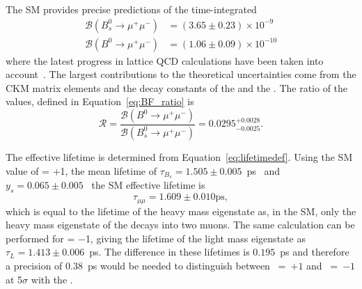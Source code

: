 The SM provides precise predictions of the time-integrated \bmumu \BFs~\cite{Bobeth:2013uxa} %
\begin{align}
\mathcal{B}(B^0_{s} \to \mu^+ \mu^-)& = (3.65 \pm 0.23) \times 10^{-9}\\
\mathcal{B}(B^0 \to\mu^+ \mu^-)& = (1.06 \pm 0.09) \times 10^{-10}
\end{align}
where the latest progress in lattice QCD calculations have been taken into account~\cite{Bazavov:2011aa, Na:2012kp,Witzel:2013sla}. %
The largest contributions to the theoretical uncertainties come from the CKM matrix elements and the decay constants of the \bs and the \bd.
The ratio of the \BF values, defined in Equation~\ref{eq:BF_ratio} is~\cite{CMS:2014xfa} 
\begin{equation}
\mathcal{R} = \frac{\mathcal{B}(B^0 \to\mu^+ \mu^-)}{\mathcal{B}(B^0_{s} \to \mu^+ \mu^-)} = 0.0295^{+0.0028}_{-0.0025}.
\end{equation}


The \bsmumu effective lifetime is determined from Equation~\ref{eq:lifetimedef}. Using the SM value of \ADG = +1, the \bs mean lifetime of $\tau_{B_{s}} = 1.505 \pm 0.005$~ps~\cite{Amhis:2016xyh} and $y_{s} = 0.065 \pm 0.005$~\cite{Olive:2016xmw} the SM effective lifetime is
\begin{equation}
\tau_{\mu\mu} = 1.609 \pm 0.010 \mathrm{ps},
\end{equation}
which is equal to the lifetime of the heavy \bs mass eigenstate as, in the SM, only the heavy mass eigenstate of the \bs decays into two muons. The same calculation can be performed for \ADG = $-$1, giving the lifetime of the light mass \bs eigenstate as $\tau_{L} = 1.413 \pm 0.006$~ps.
The difference in these lifetimes is $0.195$~ps and therefore a precision of 0.38~ps would be needed to distinguish between \ADG~=~$+1$ and \ADG~=~$-1$ at 5$\sigma$ with the \el. 



